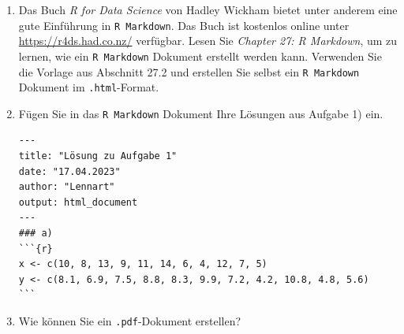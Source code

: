\begin{enumerate}

\item Das Buch \emph{R for Data Science} von Hadley Wickham bietet unter anderem eine gute Einführung in \texttt{R Markdown}. Das Buch ist kostenlos online unter \href{https://r4ds.had.co.nz/}{https://r4ds.had.co.nz/} verfügbar. Lesen Sie \emph{Chapter 27: R Markdown}, um zu lernen, wie ein \texttt{R Markdown} Dokument erstellt werden kann. Verwenden Sie die Vorlage aus Abschnitt 27.2 und erstellen Sie selbst ein \texttt{R Markdown} Dokument im \texttt{.html}-Format.

    
\item Fügen Sie in das \texttt{R Markdown} Dokument Ihre Lösungen aus Aufgabe 1) ein.

\ifcomment
\begin{framed}
\begin{minipage}[fragile]{0.9\textwidth}
\begin{verbatim}
---
title: "Lösung zu Aufgabe 1"
date: "17.04.2023"
author: "Lennart"
output: html_document
---
### a)
```{r}
x <- c(10, 8, 13, 9, 11, 14, 6, 4, 12, 7, 5)
y <- c(8.1, 6.9, 7.5, 8.8, 8.3, 9.9, 7.2, 4.2, 10.8, 4.8, 5.6)
```
\end{verbatim}
\end{minipage}
\end{framed}
\fi

\item Wie können Sie ein \texttt{.pdf}-Dokument erstellen?

\end{enumerate}



